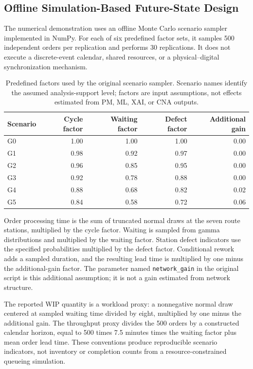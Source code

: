 \documentclass[pdflatex,iicol,Numbered,sn-basic]{sn-jnl}
\begin{document}
\subsection{Offline Simulation-Based Future-State Design}
\label{subsec:digital_twin_future_state}

The numerical demonstration uses an offline Monte Carlo scenario sampler implemented in NumPy. For each of six predefined factor sets, it samples 500 independent orders per replication and performs 30 replications. It does not execute a discrete-event calendar, shared resources, or a physical--digital synchronization mechanism.

\begin{table}[t]
\caption{Predefined factors used by the original scenario sampler. Scenario names identify the assumed analysis-support level; factors are input assumptions, not effects estimated from PM, ML, XAI, or CNA outputs.}
\label{tab:scenario_factors}
\centering\small
\begin{tabular}{lrrrr}
\toprule
Scenario & Cycle factor & Waiting factor & Defect factor & Additional gain\\
\midrule
G0 & 1.00 & 1.00 & 1.00 & 0.00\\
G1 & 0.98 & 0.92 & 0.97 & 0.00\\
G2 & 0.96 & 0.85 & 0.95 & 0.00\\
G3 & 0.92 & 0.78 & 0.88 & 0.00\\
G4 & 0.88 & 0.68 & 0.82 & 0.02\\
G5 & 0.84 & 0.58 & 0.72 & 0.06\\
\bottomrule
\end{tabular}
\end{table}

Order processing time is the sum of truncated normal draws at the seven route stations, multiplied by the cycle factor. Waiting is sampled from gamma distributions and multiplied by the waiting factor. Station defect indicators use the specified probabilities multiplied by the defect factor. Conditional rework adds a sampled duration, and the resulting lead time is multiplied by one minus the additional-gain factor. The parameter named \texttt{network\_gain} in the original script is this additional assumption; it is not a gain estimated from network structure.

The reported WIP quantity is a workload proxy: a nonnegative normal draw centered at sampled waiting time divided by eight, multiplied by one minus the additional gain. The throughput proxy divides the 500 orders by a constructed calendar horizon, equal to 500 times 7.5 minutes times the waiting factor plus mean order lead time. These conventions produce reproducible scenario indicators, not inventory or completion counts from a resource-constrained queueing simulation.
\end{document}
